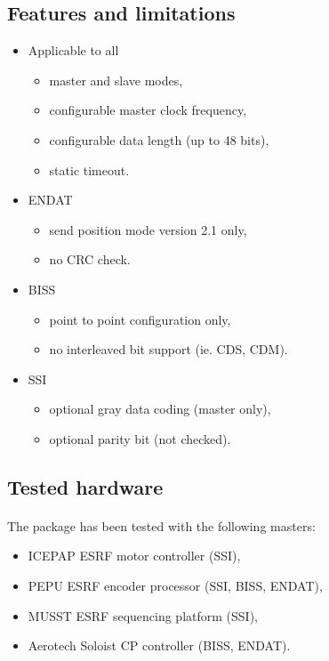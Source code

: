 \documentclass[12pt]{article}
\begin{document}
\subsection{Features and limitations}
\begin{itemize}
\item Applicable to all
  \begin{itemize}
  \item master and slave modes,
  \item configurable master clock frequency,
  \item configurable data length (up to 48 bits),
  \item static timeout.
  \end{itemize}
\item ENDAT
  \begin{itemize}
  \item send position mode version 2.1 only,
  \item no CRC check.
  \end{itemize}
\item BISS
  \begin{itemize}
  \item point to point configuration only,
  \item no interleaved bit support (ie. CDS, CDM).
  \end{itemize}
\item SSI
   \begin{itemize}
   \item optional gray data coding (master only),
   \item optional parity bit (not checked).
   \end{itemize}
\end{itemize}


\subsection{Tested hardware}
\paragraph{}
The package has been tested with the following masters:
\begin{itemize}
  \item ICEPAP ESRF motor controller (SSI),
  \item PEPU ESRF encoder processor (SSI, BISS, ENDAT),
  \item MUSST ESRF sequencing platform (SSI),
  \item Aerotech Soloist CP controller (BISS, ENDAT).
\end{itemize}
\end{document}
